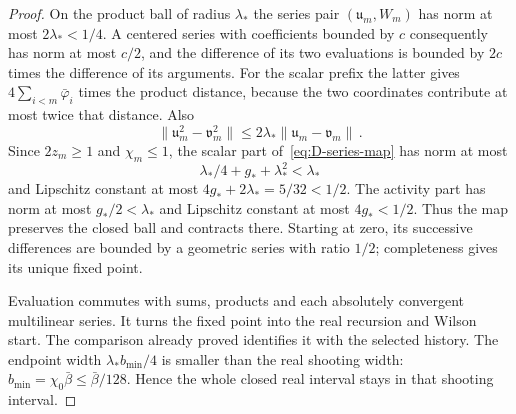\begin{proof}
On the product ball of radius $\lambda_*$ the series pair $(\mathfrak u_m,W_m)$ has norm at most $2\lambda_*<1/4$. A centered series with coefficients bounded by $c$ consequently has norm at most $c/2$, and the difference of its two evaluations is bounded by $2c$ times the difference of its arguments. For the scalar prefix the latter gives $4\sum_{i<m}\bar\varphi_i$ times the product distance, because the two coordinates contribute at most twice that distance. Also
\begin{equation*}
\|\mathfrak u_m^2-\mathfrak v_m^2\|\le2\lambda_*\|\mathfrak u_m-\mathfrak v_m\|\,.
\end{equation*}
Since $2z_m\ge1$ and $\chi_m\le1$, the scalar part of~\eqref{eq:D-series-map} has norm at most
\begin{equation*}
\lambda_*/4+g_*+\lambda_*^2<\lambda_*
\end{equation*}
and Lipschitz constant at most $4g_*+2\lambda_*=5/32<1/2$. The activity part has norm at most $g_*/2<\lambda_*$ and Lipschitz constant at most $4g_*<1/2$. Thus the map preserves the closed ball and contracts there. Starting at zero, its successive differences are bounded by a geometric series with ratio $1/2$; completeness gives its unique fixed point. 

Evaluation commutes with sums, products and each absolutely convergent multilinear series. It turns the fixed point into the real recursion and Wilson start. The comparison already proved identifies it with the selected history. The endpoint width $\lambda_*b_{\min}/4$ is smaller than the real shooting width: $b_{\min}=\chi_0\bar\beta\le\bar\beta/128$. Hence the whole closed real interval stays in that shooting interval.
\end{proof}

